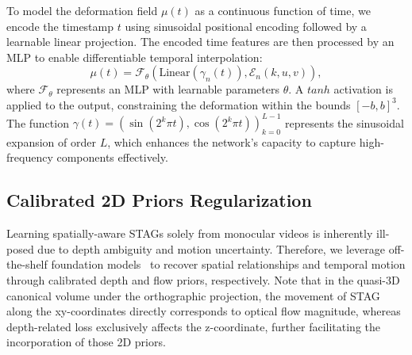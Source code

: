 To model the deformation field $\mu(t)$ as a continuous function of time, we encode the timestamp $t$ using sinusoidal positional encoding followed by a learnable linear projection. The encoded time features are then processed by an MLP to enable differentiable temporal interpolation:
\begin{equation}
\mu(t) = \mathcal{F}_{\theta}(\text{Linear}(\gamma_{n}(t)), \mathcal{E}_n(k, u, v)),
\end{equation}
where $\mathcal{F}_{\theta}$ represents an MLP with learnable parameters $\theta$. A $tanh$ activation is applied to the output, constraining the deformation within the bounds $[-b, b]^3$. The function $\gamma(t) = \left( \sin(2^k \pi t), \cos(2^k \pi t) \right)_{k=0}^{L-1}$ represents the sinusoidal expansion of order $L$, which enhances the network's capacity to capture high-frequency components effectively.











\subsection{Calibrated 2D Priors Regularization}
\label{prior}


Learning spatially-aware STAGs solely from monocular videos is inherently ill-posed due to depth ambiguity and motion uncertainty. Therefore, we leverage off-the-shelf foundation models~\cite{xu2023unifying, chen2025video} to recover spatial relationships and temporal motion through calibrated depth and flow priors, respectively. Note that in the quasi-3D canonical volume under the orthographic projection, the movement of STAG along the xy-coordinates directly corresponds to optical flow magnitude, whereas depth-related loss exclusively affects the z-coordinate, further facilitating the incorporation of those 2D priors. 

